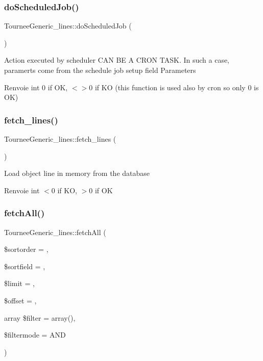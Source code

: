 \subsubsection{\texorpdfstring{do\+Scheduled\+Job()}{doScheduledJob()}}
{\footnotesize\ttfamily Tournee\+Generic\+\_\+lines\+::do\+Scheduled\+Job (\begin{DoxyParamCaption}{ }\end{DoxyParamCaption})}

Action executed by scheduler C\+AN BE A C\+R\+ON T\+A\+SK. In such a case, paramerts come from the schedule job setup field \textquotesingle{}Parameters\textquotesingle{}

\begin{DoxyReturn}{Renvoie}
int 0 if OK, $<$$>$0 if KO (this function is used also by cron so only 0 is OK) 
\end{DoxyReturn}
\mbox{\label{classTourneeGeneric__lines_a2880dfd212b76bb18b6f1feb4f8513ef}} 
\subsubsection{\texorpdfstring{fetch\+\_\+lines()}{fetch\_lines()}}
{\footnotesize\ttfamily Tournee\+Generic\+\_\+lines\+::fetch\+\_\+lines (\begin{DoxyParamCaption}{ }\end{DoxyParamCaption})}

Load object line in memory from the database

\begin{DoxyReturn}{Renvoie}
int $<$0 if KO, $>$0 if OK 
\end{DoxyReturn}
\mbox{\label{classTourneeGeneric__lines_ab1dd2a62a299cd4f575bec998bce2427}} 
\subsubsection{\texorpdfstring{fetch\+All()}{fetchAll()}}
{\footnotesize\ttfamily Tournee\+Generic\+\_\+lines\+::fetch\+All (\begin{DoxyParamCaption}\item[{}]{\$sortorder = {\ttfamily \textquotesingle{}\textquotesingle{}},  }\item[{}]{\$sortfield = {\ttfamily \textquotesingle{}\textquotesingle{}},  }\item[{}]{\$limit = {},  }\item[{}]{\$offset = {},  }\item[{array}]{\$filter = {\ttfamily array()},  }\item[{}]{\$filtermode = {\ttfamily \textquotesingle{}AND\textquotesingle{}} }\end{DoxyParamCaption})}

